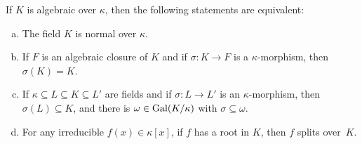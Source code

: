 \begin{thm}\label{thm:normal-equivalences}
    If\/ $K$ is algebraic over\/ $\kappa$, then the following statements are equivalent:
    \begin{enumerate}[a), font=\upshape]
        \item The field\/ $K$ is normal over\/ $\kappa$.
        
        \item If\/ $F$ is an algebraic closure of\/ $K$ and if\/ $\sigma \colon K \to F$ is a\/ $\kappa$-morphism, then\/ $\sigma(K) = K$.

        \item If\/ $\kappa \subseteq L \subseteq K \subseteq L'$ are fields and if\/ $\sigma \colon L \to L'$ is an\/ $\kappa$-morphism, then\/ $\sigma(L) \subseteq K$, and there is\/ $\omega \in \operatorname{Gal}(K/\kappa)$ with\/ $\sigma\subseteq\omega$.
        
        \item For any irreducible\/ $f(x) \in \kappa[x]$, if\/ $f$ has a root in\/ $K$, then\/ $f$ splits over\/~$K$.
    \end{enumerate}
\end{thm}

